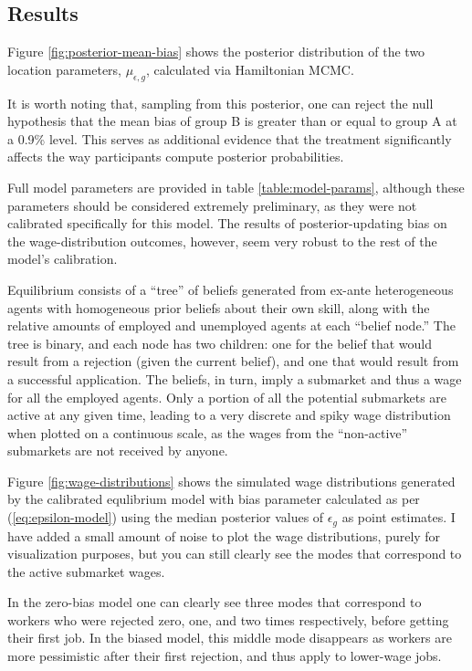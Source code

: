 \documentclass[a4paper,12pt]{article}
\begin{document}
\subsection{ Results }

Figure \ref{fig:posterior-mean-bias} shows the posterior distribution of the two location parameters, $\mu_{\epsilon, g}$, calculated via Hamiltonian MCMC.

It is worth noting that, sampling from this posterior, one can reject the null hypothesis that the mean bias of group B is greater than or equal to group A at a 0.9\% level. This serves as additional evidence that the treatment significantly affects the way participants compute posterior probabilities.

Full model parameters are provided in table \ref{table:model-params}, although these parameters should be considered extremely preliminary, as they were not calibrated specifically for this model. The results of posterior-updating bias on the wage-distribution outcomes, however, seem very robust to the rest of the model's calibration.

Equilibrium consists of a ``tree'' of beliefs generated from ex-ante heterogeneous agents with homogeneous prior beliefs about their own skill, along with the relative amounts of employed and unemployed agents at each ``belief node.'' The tree is binary, and each node has two children: one for the belief that would result from a rejection (given the current belief), and one that would result from a successful application. The beliefs, in turn, imply a submarket and thus a wage for all the employed agents. Only a portion of all the potential submarkets are active at any given time, leading to a very discrete and spiky wage distribution when plotted on a continuous scale, as the wages from the ``non-active'' submarkets are not received by anyone.

Figure \ref{fig:wage-distributions} shows the simulated wage distributions generated by the calibrated equlibrium model with bias parameter calculated as per (\ref{eq:epsilon-model}) using the median posterior values of $\epsilon_g$ as point estimates. I have added a small amount of noise to plot the wage distributions, purely for visualization purposes, but you can still clearly see the modes that correspond to the active submarket wages.

In the zero-bias model one can clearly see three modes that correspond to workers who were rejected zero, one, and two times respectively, before getting their first job. In the biased model, this middle mode disappears as workers are more pessimistic after their first rejection, and thus apply to lower-wage jobs.
\end{document}
